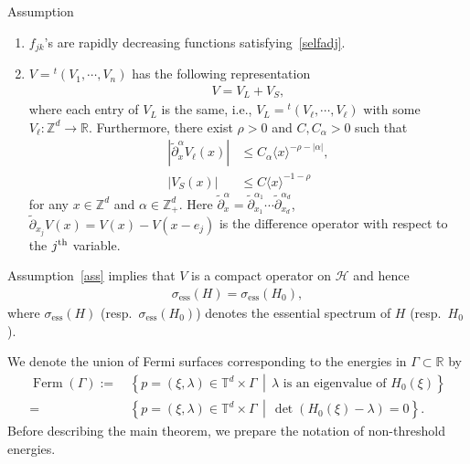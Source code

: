 \documentclass[AHL,Unicode,longabstracts,published]{cedram}
\renewcommand{\a}{\alpha}
\renewcommand{\l}{\lambda}
\newcommand{\x}{\xi}
\newcommand{\R}{\mathbb{R}}
\newcommand{\Z}{\mathbb{Z}}
\newcommand{\T}{\mathbb{T}}
\newcommand{\HS}{\mathcal{H}}
\newcommand{\la}{\langle}
\newcommand{\ra}{\rangle}
\DeclareMathOperator{\Ferm}{Ferm}
\newcommand{\Z}{\mathbb{Z}}
\newcommand{\R}{\mathbb{R}}
\newcommand{\HS}{\mathcal{H}}
\begin{document}
\begin{enonce}{Assumption}\label{ass}\leavevmode
\begin{enumerate}
\item\label{assum1.1.1} $f_{jk}$'s are rapidly decreasing functions satisfying~\eqref{selfadj}.

\item\label{assum1.1.2} $V={}^t(V_1, \cdots, V_n)$ has the following representation
\begin{align*}
V=V_L + V_S,
\end{align*}
where each entry of $V_L$ is the same, i.e., $V_L={}^t(V_\ell, \cdots, V_\ell)$ with some $V_\ell : \Z^d \to \R$. Furthermore, there exist $\rho>0$ and $C,C_\a>0$ such that
\begin{align}
\left|\tilde\partial_x^\a V_\ell(x)\right| &\leq C_\a \la x \ra^{-\rho-|\a|}, \label{long range}
\\
|V_S(x)| &\leq C \la x \ra^{-1-\rho} \label{short range}
\end{align}
for any $x\in\Z^d$ and $\a\in\Z_+^d$. Here $\tilde\partial_x^\a=\tilde\partial_{x_1}^{\a_1} \cdots \tilde\partial_{x_d}^{\a_d}$, $\tilde \partial_{x_j} V(x)=V(x)-V(x-e_j)$ is the difference operator with respect to the $j^{\rm th}$ variable.
\end{enumerate}
\end{enonce}


Assumption~\ref{ass} implies that $V$ is a compact operator on $\HS$ and hence
\begin{align*}
\sigma_{\operatorname{ess}}(H)=\sigma_{\operatorname{ess}}(H_0),
\end{align*}
where $\sigma_{\operatorname{ess}}(H)$ (resp.\ $\sigma_{\operatorname{ess}}(H_0)$) denotes the essential spectrum of $H$ (resp.\ $H_0$).


We denote the union of Fermi surfaces corresponding to the energies in $\Gamma\subset\R$ by
\begin{align*}
\Ferm(\Gamma):=&\,\left\{ p = (\x,\l)\in\T^d\times\Gamma \,\middle|\, \l \text{ is an eigenvalue of }H_0(\x) \right\} \\
=&\, \left\{ p = (\x,\l)\in\T^d\times\Gamma \,\middle|\, \det \left(H_0(\x)-\l\right)=0 \right\}. 
\end{align*}
Before describing the main theorem, we prepare the notation of non-threshold energies.
\end{document}
